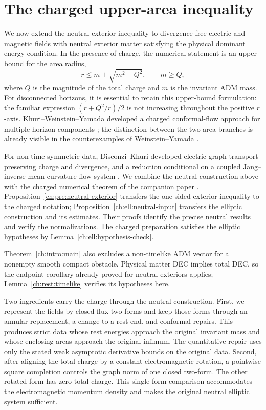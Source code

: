 \section{The charged upper-area inequality}
\label{ch:intro:charged-section}

We now extend the neutral exterior inequality to divergence-free electric and magnetic fields with neutral exterior matter satisfying the physical dominant energy condition. In the presence of charge, the numerical statement is an upper bound for the area radius,
\begin{equation}\label{ch:intro:bound}
 r\le m+\sqrt{m^2-Q^2},\qquad m\ge Q,
\end{equation}
where $Q$ is the magnitude of the total charge and $m$ is the invariant ADM mass. For disconnected horizons, it is essential to retain this upper-bound formulation: the familiar expression $(r+Q^2/r)/2$ is not increasing throughout the positive $r$-axis. Khuri--Weinstein--Yamada developed a charged conformal-flow approach for multiple horizon components \cite{KhuriWeinsteinYamada2017}; the distinction between the two area branches is already visible in the counterexamples of Weinstein--Yamada \cite{WeinsteinYamada2005}.

For non-time-symmetric data, Disconzi--Khuri developed electric graph transport preserving charge and divergence, and a reduction conditional on a coupled Jang--inverse-mean-curvature-flow system \cite{DisconziKhuri2012}. We combine the neutral construction above with the charged numerical theorem of the companion paper \cite[Theorem~2.3]{ChargedOriginalData2026}. Proposition~\ref{ch:pre:neutral-exterior} transfers the one-sided exterior inequality to the charged notation; Proposition~\ref{ch:ell:neutral-input} transfers the elliptic construction and its estimates. Their proofs identify the precise neutral results and verify the normalizations. The charged preparation satisfies the elliptic hypotheses by Lemma~\ref{ch:ell:hypothesis-check}.

Theorem~\ref{ch:intro:main} also excludes a non-timelike ADM vector for a
nonempty smooth compact obstacle. Physical matter DEC implies total DEC,
so the endpoint corollary already proved for neutral exteriors applies;
Lemma~\ref{ch:rest:timelike} verifies its hypotheses here.



Two ingredients carry the charge through the neutral construction. First, we represent the fields by closed flux two-forms and keep those forms through an annular replacement, a change to a rest end, and conformal repairs. This produces strict data whose rest energies approach the original invariant mass and whose enclosing areas approach the original infimum. The quantitative repair uses only the stated weak asymptotic derivative bounds on the original data. Second, after aligning the total charge by a constant electromagnetic rotation, a pointwise square completion controls the graph norm of one closed two-form. The other rotated form has zero total charge. This single-form comparison accommodates the electromagnetic momentum density and makes the original neutral elliptic system sufficient.

